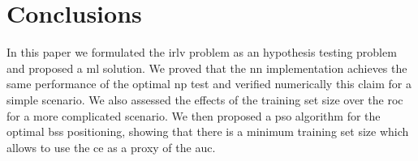 \documentclass[conference,final]{IEEEtran}
\begin{document}
 
\section{Conclusions}
\label{sec:conc}

In this paper we formulated the \ac{irlv} problem as an hypothesis testing problem and proposed a \ac{ml} solution. We proved that the \ac{nn} implementation achieves the same performance of the optimal \ac{np} test and verified numerically this claim for a simple scenario. We also assessed the effects of the training set size over the \ac{roc} for a more complicated scenario. We then proposed a \ac{pso} algorithm for the  optimal \acp{bs} positioning, showing that there is a minimum training set size which allows to use the \ac{ce} as a proxy of the \ac{auc}.


\renewcommand*{\bibfont}{\footnotesize}

\printbibliography
\end{document}
